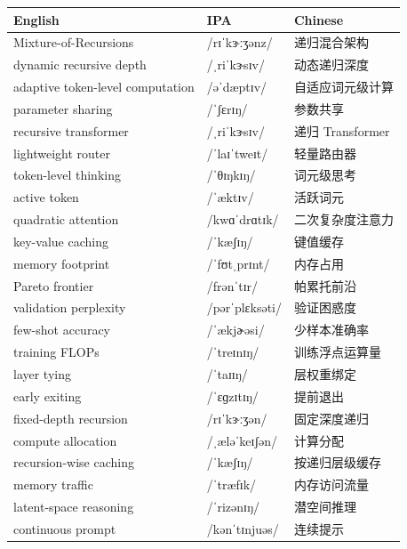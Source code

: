 \documentclass[UTF8,12pt,a4paper]{ctexart}
\providecommand{\zh}[1]{#1}
\begin{document}
\begin{tabular*}{\textwidth}{@{\extracolsep{\fill}}lll@{}}
\toprule
\textbf{English} & \textbf{IPA} & \textbf{Chinese} \\
\midrule
Mixture-of-Recursions & {\ipafont /rɪˈkɝːʒənz/} & \zh{递归混合架构} \\
dynamic recursive depth & {\ipafont /ˌriˈkɝsɪv/} & \zh{动态递归深度} \\
adaptive token-level computation & {\ipafont /əˈdæptɪv/} & \zh{自适应词元级计算} \\
parameter sharing & {\ipafont /ˈʃɛrɪŋ/} & \zh{参数共享} \\
recursive transformer & {\ipafont /ˌriˈkɝsɪv/} & \zh{递归 Transformer} \\
lightweight router & {\ipafont /ˈlaɪˈtweɪt/} & \zh{轻量路由器} \\
token-level thinking & {\ipafont /ˈθɪŋkɪŋ/} & \zh{词元级思考} \\
active token & {\ipafont /ˈæktɪv/} & \zh{活跃词元} \\
quadratic attention & {\ipafont /kwɑˈdrɑtɪk/} & \zh{二次复杂度注意力} \\
key-value caching & {\ipafont /ˈkæʃɪŋ/} & \zh{键值缓存} \\
memory footprint & {\ipafont /ˈfʊtˌprɪnt/} & \zh{内存占用} \\
Pareto frontier & {\ipafont /frənˈtɪr/} & \zh{帕累托前沿} \\
validation perplexity & {\ipafont /pərˈplɛksəti/} & \zh{验证困惑度} \\
few-shot accuracy & {\ipafont /ˈækjɚəsi/} & \zh{少样本准确率} \\
training FLOPs & {\ipafont /ˈtreɪnɪŋ/} & \zh{训练浮点运算量} \\
layer tying & {\ipafont /ˈtaɪɪŋ/} & \zh{层权重绑定} \\
early exiting & {\ipafont /ˈɛɡzɪtɪŋ/} & \zh{提前退出} \\
fixed-depth recursion & {\ipafont /rɪˈkɝːʒən/} & \zh{固定深度递归} \\
compute allocation & {\ipafont /ˌæləˈkeɪʃən/} & \zh{计算分配} \\
recursion-wise caching & {\ipafont /ˈkæʃɪŋ/} & \zh{按递归层级缓存} \\
memory traffic & {\ipafont /ˈtræfɪk/} & \zh{内存访问流量} \\
latent-space reasoning & {\ipafont /ˈrizənɪŋ/} & \zh{潜空间推理} \\
continuous prompt & {\ipafont /kənˈtɪnjuəs/} & \zh{连续提示} \\

\end{tabular*}
\end{document}
